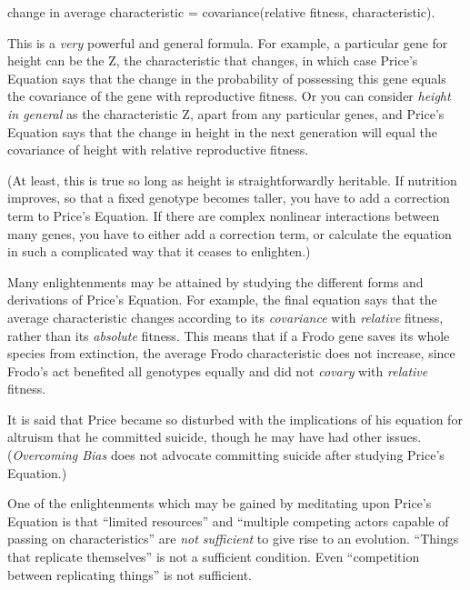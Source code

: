 \bigskip

{\centering
 change in average characteristic = covariance(relative fitness,
characteristic).
\par}


\bigskip

{
 This is a \textit{very} powerful and general formula. For example,
a particular gene for height can be the Z, the characteristic that
changes, in which case Price's Equation says that the
change in the probability of possessing this gene equals the covariance
of the gene with reproductive fitness. Or you can consider
\textit{height in general} as the characteristic Z, apart from any
particular genes, and Price's Equation says that the
change in height in the next generation will equal the covariance of
height with relative reproductive fitness. }

{
 (At least, this is true so long as height is straightforwardly
heritable. If nutrition improves, so that a fixed genotype becomes
taller, you have to add a correction term to Price's
Equation. If there are complex nonlinear interactions between many
genes, you have to either add a correction term, or calculate the
equation in such a complicated way that it ceases to enlighten.)}

{
 Many enlightenments may be attained by studying the different
forms and derivations of Price's Equation. For example,
the final equation says that the average characteristic changes
according to its \textit{covariance} with \textit{relative} fitness,
rather than its \textit{absolute} fitness. This means that if a Frodo
gene saves its whole species from extinction, the average Frodo
characteristic does not increase, since Frodo's act
benefited all genotypes equally and did not \textit{covary} with
\textit{relative} fitness.}

{
 It is said that Price became so disturbed with the implications of
his equation for altruism that he committed suicide, though he may have
had other issues. (\textit{Overcoming Bias} does not advocate
committing suicide after studying Price's Equation.)}

{
 One of the enlightenments which may be gained by meditating upon
Price's Equation is that ``limited
resources'' and ``multiple competing
actors capable of passing on characteristics'' are
\textit{not sufficient} to give rise to an evolution.
``Things that replicate themselves''
is not a sufficient condition. Even ``competition
between replicating things'' is not sufficient.}

